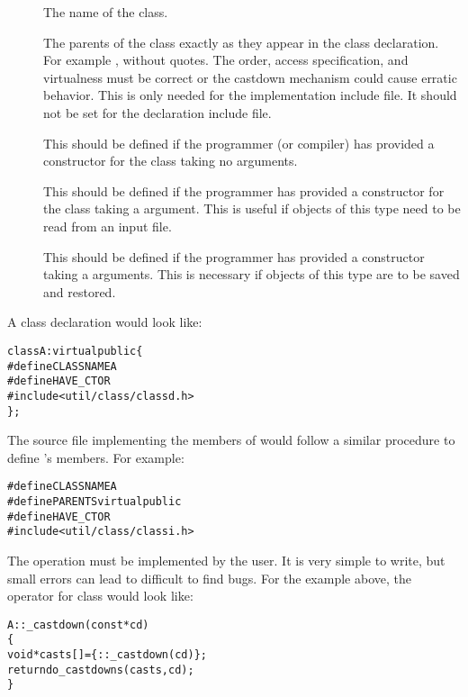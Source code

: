 \begin{description}
\item[]
  The name of the class.
\item[]
  The parents of the class exactly as they appear in the class
  declaration.  For example ,
  without quotes.  The order, access specification, and virtualness
  must be correct or the castdown mechanism could cause erratic behavior.
  This is only needed for the implementation include file.  It should
  not be set for the declaration include file.
\item[]
  This should be defined if the programmer (or compiler) has provided
  a constructor for the class taking no arguments.
\item[]
  This should be defined if the programmer has provided
  a constructor for the class taking a \srccd{\&} argument.
  This is useful if objects of this type need to be read from
  an input file.
\item[]
  This should be defined if the programmer has provided
  a constructor taking a \srccd{\&} arguments.
  This is necessary if objects of this type are to be saved and
  restored.
\end{description}

A class declaration would look like:

\begin{alltt}
class A: virtual public  \{
#  define CLASSNAME A
#  define HAVE_CTOR
#  include <util/class/classd.h>
\};
\end{alltt}

The source file implementing the members of  would follow a
similar procedure to define 's members.  For example:

\begin{alltt}
#define CLASSNAME A
#define PARENTS virtual public 
#define HAVE_CTOR
#include <util/class/classi.h>
\end{alltt}

The  operation must be implemented by the user.
It is very simple to write, but small errors can lead to difficult
to find bugs.  For the example above, the  operator for
class  would look like:

\begin{alltt}
A::_castdown(const *cd)
\{
  void* casts[] =  \{ ::_castdown(cd) \};
  return do_castdowns(casts,cd);
\}
\end{alltt}

